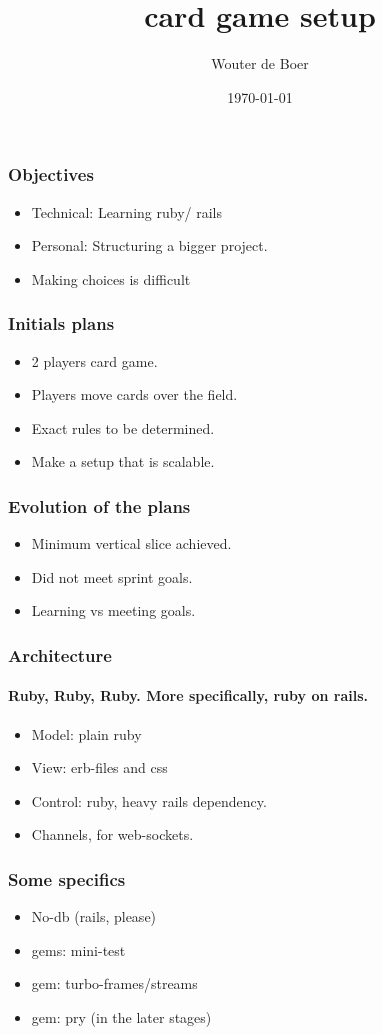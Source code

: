 \documentclass[17pt]{beamer}
\begin{document}
	\author{Wouter de Boer}
	\title{card game setup}
	\date{\today}
	\subject{Individual project}
	\begin{frame}[plain]
		\maketitle
	\end{frame}
	
	\begin{frame}
		\frametitle{Objectives}
		\begin{itemize}
			\item Technical: Learning ruby/ rails
			\item Personal: Structuring a bigger project.
			\item Making choices is difficult
		\end{itemize}
	\end{frame}

	\begin{frame}
		\frametitle{Initials plans}

		\begin{itemize}
			\item 2 players card game.
			\item Players move cards over the field.
			\item Exact rules to be determined.
				\item Make a setup that is scalable.
		\end{itemize}
	\end{frame}

	\begin{frame}
		\frametitle{Evolution of the plans}
	\begin{itemize}
		\item  Minimum vertical slice achieved.
		\item  Did not meet sprint goals.
		\item Learning vs meeting goals.
	\end{itemize}
	\end{frame}
	\begin{frame}
		\frametitle{Architecture}
		\framesubtitle{Ruby, Ruby, Ruby. More specifically, ruby on rails.}
		\begin{itemize}
		\item Model: plain ruby
		\item View: erb-files and css
		\item Control: ruby, heavy rails dependency.
		\item Channels, for web-sockets.
		\end{itemize}
	\end{frame}
	\begin{frame}
		\frametitle{Some specifics}
		\begin{itemize}
			\item No-db (rails, please)
			\item gems: mini-test
			\item gem: turbo-frames/streams
			\item gem: pry (in the later stages)
		\end{itemize}
	\end{frame}
\end{document}
